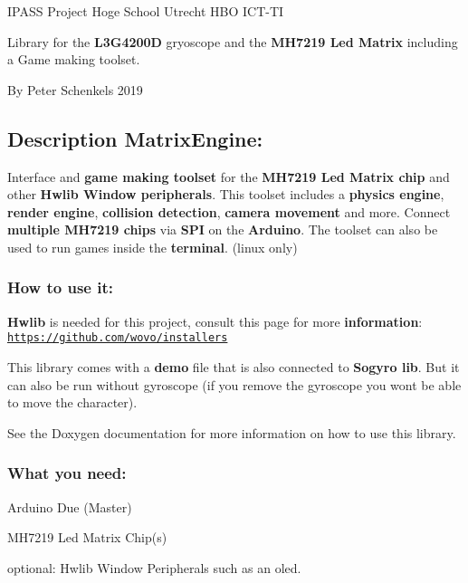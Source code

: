 I\+P\+A\+SS Project Hoge School Utrecht H\+BO I\+C\+T-\/\+TI

Library for the {\bfseries L3\+G4200D} gryoscope and the {\bfseries M\+H7219 Led Matrix} including a Game making toolset.

By Peter Schenkels 2019





\subsection*{Description Matrix\+Engine\+:}

Interface and {\bfseries game making toolset} for the {\bfseries M\+H7219 Led Matrix chip} and other {\bfseries Hwlib Window peripherals}. This toolset includes a {\bfseries physics engine}, {\bfseries render engine}, {\bfseries collision detection}, {\bfseries camera movement} and more. Connect {\bfseries multiple M\+H7219 chips} via {\bfseries S\+PI} on the {\bfseries Arduino}. The toolset can also be used to run games inside the {\bfseries terminal}. (linux only)

\subsubsection*{How to use it\+:}

{\bfseries Hwlib} is needed for this project, consult this page for more {\bfseries information}\+: \href{https://github.com/wovo/installers}{\tt https\+://github.\+com/wovo/installers}

This library comes with a {\bfseries demo} file that is also connected to {\bfseries Sogyro lib}. But it can also be run without gyroscope (if you remove the gyroscope you wont be able to move the character).

See the Doxygen documentation for more information on how to use this library.

\subsubsection*{What you need\+:}


\begin{DoxyItemize}
\item Arduino Due (Master)
\item M\+H7219 Led Matrix Chip(s)
\end{DoxyItemize}

optional\+: Hwlib Window Peripherals such as an oled. 